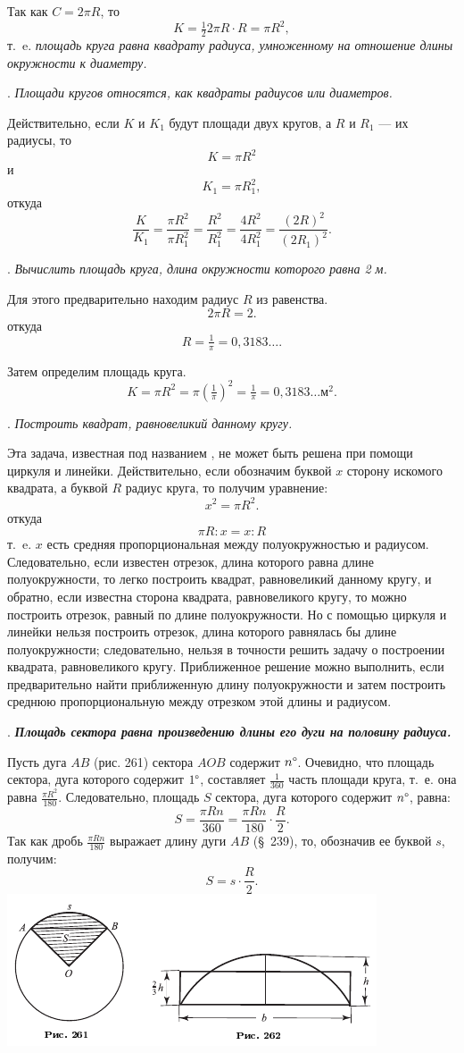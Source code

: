 \documentclass[oneside]{book}
\begin{document}
Так как $C=2\pi R$, то
\[K=\tfrac122\pi R\cdot R=\pi R^2,\]
т.~e. \emph{площадь круга равна квадрату радиуса, умноженному на отношение длины окружности к диаметру.}

.
\emph{Площади кругов относятся, как квадраты радиусов или диаметров.}

Действительно, если $K$ и $K_1$ будут площади двух кругов, а $R$ и $R_1$ — их радиусы, то
\[K=\pi R^2\]
и
\[K_1=\pi R_1^2,\]
откуда
\[\frac{K}{K_1}=\frac{\pi R^2}{\pi R^2_1}=\frac{R^2}{R^2_1}=\frac{4R^2}{4R^2_1}=\frac{(2R)^2}{(2R_1)^2}.\]

.
\emph{Вычислить площадь круга, длина окружности которого равна 2 м.}

Для этого предварительно находим радиус $R$ из равенства.
\[2\pi R= 2.\]
откуда
\[R=\tfrac1\pi=0{,}3183\dots.\]

Затем определим площадь круга.
\[K=\pi R^2=\pi(\tfrac1\pi)^2=\tfrac1\pi=0{,}3183\dots\text{м}^2.\]

.
\emph{Построить квадрат, равновеликий данному кругу.}

Эта задача, известная под названием , не может быть решена при помощи циркуля и линейки.
Действительно, если обозначим буквой $x$ сторону искомого квадрата, а буквой $R$ радиус круга, то получим уравнение:
\[x^2=\pi R^2.\]
откуда
\[\pi R:x=x:R\]
т.~e.
$x$ есть средняя пропорциональная между полуокружностью и радиусом.
Следовательно, если известен отрезок, длина которого равна длине полуокружности, то легко построить квадрат, равновеликий данному кругу, и обратно, если известна сторона квадрата, равновеликого кругу, то можно построить отрезок, равный по длине полуокружности.
Но с помощью циркуля и линейки нельзя построить отрезок, длина которого равнялась бы длине полуокружности;
следовательно, нельзя в точности решить задачу о построении квадрата, равновеликого кругу.
Приближенное решение можно выполнить, если предварительно найти приближенную длину полуокружности и затем построить среднюю пропорциональную между отрезком этой длины и радиусом.

.
\textbf{\emph{Площадь сектора равна произведению длины его дуги на половину радиуса.}}

Пусть дуга $AB$ (рис. 261) сектора $AOB$ содержит $n\degree$.
Очевидно, что площадь сектора, дуга которого содержит $1\degree$, составляет $\tfrac1{360}$ часть площади круга, т.~е. она равна $\frac{\pi R^2}{180}$.
Следовательно, площадь $S$ сектора, дуга которого содержит $n\degree$, равна:
\[S=\frac{\pi R n}{360}=\frac{\pi R n}{180}\cdot \frac R2.\]
Так как дробь $\frac{\pi R n}{180}$ выражает длину дуги $AB$ (§~239), то, обозначив
ее буквой $s$, получим:
\[S=s\cdot \frac R2.\]
\includegraphics{pics/ris-261-262}
\end{document}

